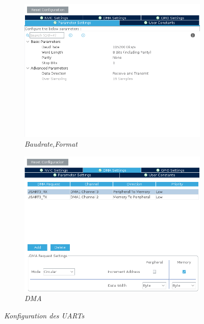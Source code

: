 \begin{figure}[h]
  \centering
  \begin{subfigure}{0.45\textwidth}
      \centering
      \includegraphics[width=\textwidth]{Pictures/parameter_uart.png}
      \caption{\textit{Baudrate,Format}}
      \label{img: Parameter}
  \end{subfigure}
  \begin{subfigure}{0.45\textwidth}
      \centering
      \includegraphics[width=\textwidth]{Pictures/dma_uart.png}
      \caption{\textit{DMA}}
      \label{img: DMA}
  \end{subfigure}
  \caption{\textit{Konfiguration des \acp{UART}}}
  \label{img: UART config}
\end{figure}

